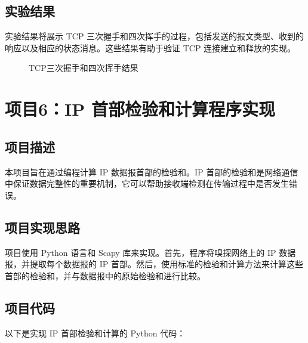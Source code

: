 \documentclass[UTF8,titlepage]{ctexart}
\numberwithin{figure}{section}
\begin{document}
\subsection{实验结果}
实验结果将展示 TCP 三次握手和四次挥手的过程，包括发送的报文类型、收到的响应以及相应的状态消息。这些结果有助于验证 TCP 连接建立和释放的实现。
\begin{figure}[H]
\centering
 \caption{TCP三次握手和四次挥手结果}
 \label{}
\end{figure}
\clearpage
\section{项目6：IP 首部检验和计算程序实现}

\subsection{项目描述}
本项目旨在通过编程计算 IP 数据报首部的检验和。IP 首部的检验和是网络通信中保证数据完整性的重要机制，它可以帮助接收端检测在传输过程中是否发生错误。

\subsection{项目实现思路}
项目使用 Python 语言和 Scapy 库来实现。首先，程序将嗅探网络上的 IP 数据报，并提取每个数据报的 IP 首部。然后，使用标准的检验和计算方法来计算这些首部的检验和，并与数据报中的原始检验和进行比较。

\subsection{项目代码}
以下是实现 IP 首部检验和计算的 Python 代码：
\end{document}
